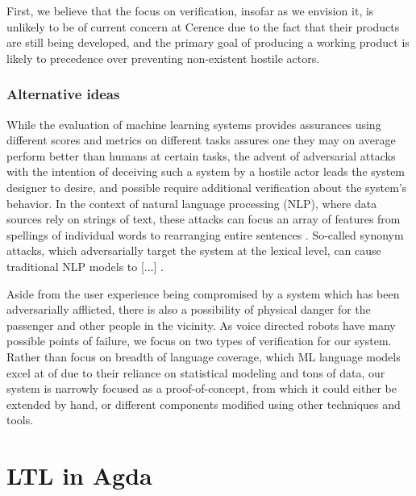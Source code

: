 \documentclass{article}
\begin{document}
First, we believe that the focus on verification, insofar as we envision it, is
unlikely to be of current concern at Cerence due to the fact that their products
are still being developed, and the primary goal of producing a working product
is likely to precedence over preventing non-existent hostile actors.

\subsubsection{Alternative ideas}

While the evaluation of machine learning systems provides assurances using
different scores and metrics on different tasks assures one they may on average
perform better than humans at certain tasks, the advent of adversarial attacks
\cite{szegedy} with the intention of deceiving such a system by a hostile actor
leads the system designer to desire, and possible require additional
verification about the system's behavior. In the context of natural language
processing (NLP), where data sources rely on strings of text, these attacks can
focus an array of features from spellings of individual words to rearranging
entire sentences \cite{}. So-called synonym attacks, which adversarially target
the system at the lexical level, can cause traditional NLP models to [...]
\cite{}.


Aside from the user experience being compromised by a system which has been
adversarially afflicted, there is also a possibility of physical danger for the
passenger and other people in the vicinity. As voice directed robots have many
possible points of failure, we focus on two types of verification for our
system. Rather than focus on breadth of language coverage, which ML language
models excel at of due to their reliance on statistical modeling and tons
of data, our system is narrowly focused as a proof-of-concept, from which it
could either be extended by hand, or different components modified using
other techniques and tools.





\section{LTL in Agda} \label{Agda}
\end{document}
